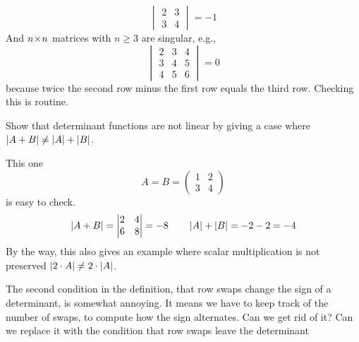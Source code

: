 \begin{exercises}
\begin{answer}
\begin{exparts}
\begin{equation*}
\begin{vmatrix}
              2  &3  \\
              3  &4
            \end{vmatrix}=-1
          \end{equation*}
          And $n \! \times \! n$ matrices with $n\geq 3$ are singular, e.g.,
          \begin{equation*}
            \begin{vmatrix}
              2  &3  &4  \\
              3  &4  &5  \\
              4  &5  &6
            \end{vmatrix}=0
          \end{equation*}
          because twice the second row minus the first row 
          equals the third row.
          Checking this is routine.
      \end{exparts} 
    \end{answer}
  \recommended \item 
    Show that determinant functions are not linear by  
    giving a case where \( \deter{A+B}\neq\deter{A}+\deter{B} \).
    \begin{answer}
      This one 
      \begin{equation*}
         A=B=
         \begin{pmatrix}
           1  &2  \\
           3  &4
         \end{pmatrix}
      \end{equation*}
      is easy to check.
      \begin{equation*}
         \deter{A+B}
         =
         \begin{vmatrix}
           2  &4  \\
           6  &8
         \end{vmatrix}
         =-8
         \qquad
         \deter{A}+\deter{B}
         =
         -2-2
         =-4
      \end{equation*}
      By the way, this also gives an example where scalar multiplication 
      is not preserved 
      $\deter{2\cdot A}\neq 2\cdot\deter{A}$.  
     \end{answer}
  \item 
    The second condition in the definition, that row swaps change the 
    sign of a determinant, is somewhat annoying.
    It means we have to keep track of the number of swaps, to compute how
    the sign alternates.
    Can we get rid of it?
    Can we replace it with the condition that row swaps leave the determinant

\end{exercises}
